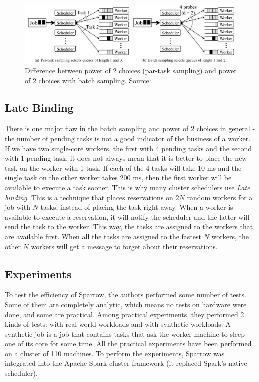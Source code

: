 \documentclass[11pt]{article}
\begin{document}
    \begin{figure}
    		\hspace*{-.8in}
    		\centering
    		\includegraphics[scale=.35]{fig2}
    		\caption{Difference between power of 2 choices (par-task sampling) and power of 2 choices with batch sampling. Source: \cite{sparrow}}
    		\label{fig2}
    \end{figure}


    \subsection{Late Binding}
    
    	There is one major flaw in the batch sampling and power of 2 choices in general - the number of pending tasks is not a good indicator of the business of a worker. If we have two single-core workers, the first with 4 pending tasks and the second with 1 pending task, it does not always mean that it is better to place the new task on the worker with 1 task. If each of the 4 tasks will take 10 ms and the single task on the other worker takes 200 ms, then the first worker will be available to execute a task sooner. This is why many cluster schedulers use \textit{Late binding}. This is a technique that places reservations on $2N$ random workers for a job with $N$ tasks, instead of placing the task right away. When a worker is available to execute a reservation, it will notify the scheduler and the latter will send the task to the worker. This way, the tasks are assigned to the workers that are available first. When all the tasks are assigned to the fastest $N$ workers, the other $N$ workers will get a message to forget about their reservations.


    \subsection{Experiments}
    
    	To test the efficiency of Sparrow, the authors performed some number of tests. Some of them are completely analytic, which means no tests on hardware were done, and some are practical. Among practical experiments, they performed 2 kinds of tests: with real-world workloads and with synthetic workloads. A synthetic job is a job that contains tasks that ask the worker machine to sleep one of its core for some time. All the practical experiments have been performed on a cluster of 110 machines. To perform the experiments, Sparrow was integrated into the Apache Spark cluster framework (it replaced Spark's native scheduler).
\end{document}
